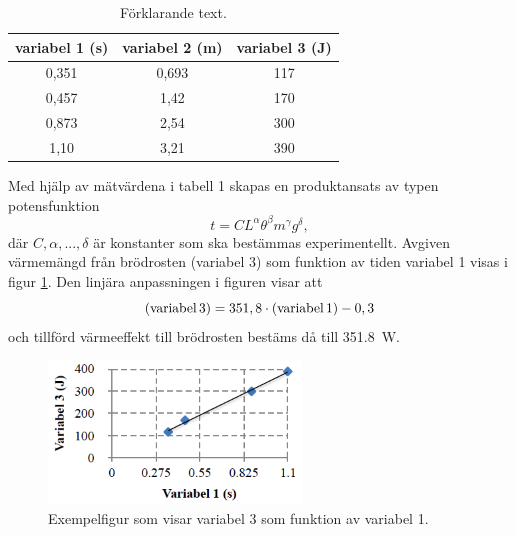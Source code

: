 \documentclass[a4paper]{article}
\begin{document}
\begin{table}[ht]
\caption{Förklarande text.}
\centering
    \begin{tabular}{c | c | c}
        \hline
        variabel 1 (s) & variabel 2 (m) & variabel 3 (J) \\
        \hline
        0,351 &	0,693 &	117 \\
        0,457 &	1,42 &	170 \\
        0,873 &	2,54 &	300 \\
        1,10 &	3,21 &	390 \\
        \hline
     \end{tabular} 
\label{tvariabel123}
\end{table}

Med hjälp av mätvärdena i tabell 1 skapas en produktansats av typen potensfunktion
\begin{equation}
t = C L^\alpha \theta^\beta m^\gamma g^\delta,
\end{equation}
där $C, \alpha, ..., \delta$ är konstanter som ska bestämmas experimentellt.
Avgiven värmemängd från brödrosten (variabel 3) som funktion av tiden variabel 1 visas i figur \ref{fvariabel3vs1}. Den linjära anpassningen i figuren visar att
\begin{equation}
{\rm (variabel \, 3)} = 351,8 \cdot {\rm (variabel \, 1)} - 0,3
\end{equation}
och tillförd värmeeffekt till brödrosten bestäms då till \SI{351,8}{W}.


\begin{figure}[ht]
\begin{center}
  \includegraphics[width=0.6\textwidth]{fig1.png}
  \caption{Exempelfigur som visar variabel 3 som funktion av variabel 1. \label{fvariabel3vs1}}
\end{center}
\end{figure}
\end{document}
